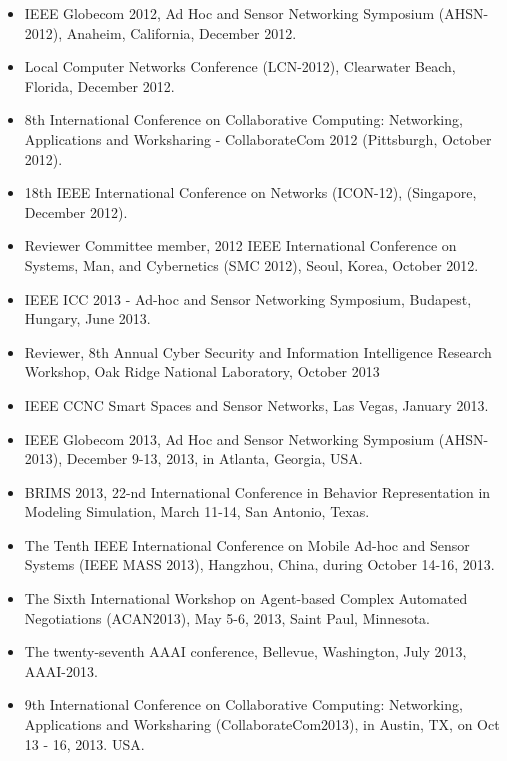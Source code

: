 \begin{itemize}
\item IEEE Globecom 2012, Ad Hoc and Sensor Networking Symposium (AHSN-2012), Anaheim, California, December 2012.

\item Local Computer Networks Conference (LCN-2012), Clearwater Beach, Florida, December 2012.

\item 8th International Conference on Collaborative Computing: Networking, Applications and Worksharing - CollaborateCom 2012 (Pittsburgh, October 2012).

\item 18th IEEE International Conference on Networks (ICON-12), (Singapore, December 2012).

\item Reviewer Committee member, 2012 IEEE International Conference on Systems, Man, and Cybernetics (SMC 2012), Seoul, Korea, October 2012.

\item IEEE ICC 2013 - Ad-hoc and Sensor Networking Symposium, Budapest, Hungary, June 2013.

\item Reviewer, 8th Annual Cyber Security and Information Intelligence Research Workshop, Oak Ridge National Laboratory, October 2013

\item IEEE CCNC Smart Spaces and Sensor Networks, Las Vegas, January 2013.

\item IEEE Globecom 2013, Ad Hoc and Sensor Networking Symposium (AHSN-2013), December 9-13, 2013, in Atlanta, Georgia, USA.

\item BRIMS 2013, 22-nd International Conference in Behavior Representation in Modeling Simulation, March 11-14, San Antonio, Texas.

\item The Tenth IEEE International Conference on Mobile Ad-hoc and Sensor Systems (IEEE MASS 2013), Hangzhou, China, during October 14-16, 2013.

\item The Sixth International Workshop on Agent-based Complex Automated Negotiations (ACAN2013), May 5-6, 2013, Saint Paul, Minnesota.

\item The twenty-seventh AAAI conference, Bellevue, Washington, July 2013, AAAI-2013.

\item 9th International Conference on Collaborative Computing: Networking, Applications and Worksharing  (CollaborateCom2013),  in Austin, TX, on Oct 13 - 16, 2013. USA.


\end{itemize}
